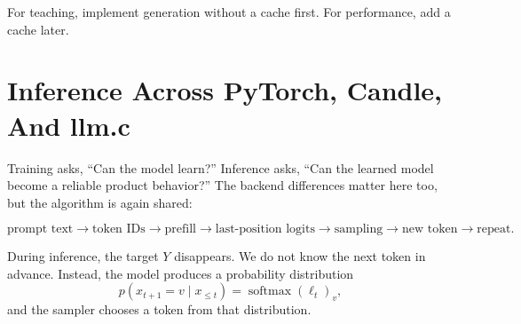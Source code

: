 \begin{center}
\end{center}

For teaching, implement generation without a cache first. For performance, add a cache later.

\section{Inference Across PyTorch, Candle, And llm.c}

Training asks, ``Can the model learn?'' Inference asks, ``Can the learned model become a
reliable product behavior?'' The backend differences matter here too, but the algorithm is
again shared:

\[
\text{prompt text}
\rightarrow \text{token IDs}
\rightarrow \text{prefill}
\rightarrow \text{last-position logits}
\rightarrow \text{sampling}
\rightarrow \text{new token}
\rightarrow \text{repeat}.
\]

During inference, the target \(Y\) disappears. We do not know the next token in advance.
Instead, the model produces a probability distribution
\[
p(x_{t+1}=v \mid x_{\le t}) =
\operatorname{softmax}(\ell_t)_v,
\]
and the sampler chooses a token from that distribution.


